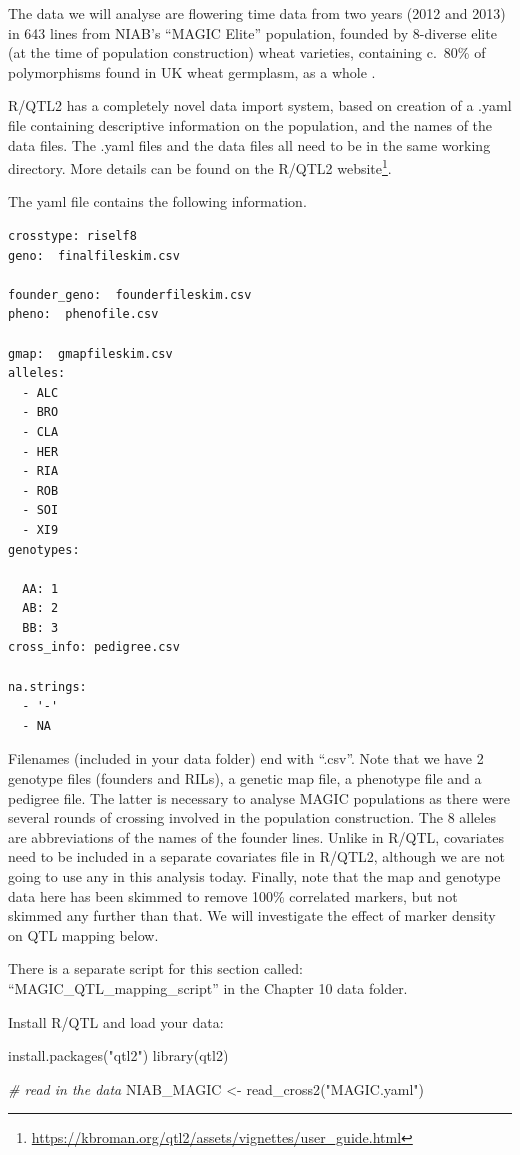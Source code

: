\documentclass[
]{book}
\makeatletter
\newenvironment{Shaded}{\begin{snugshade}}{\end{snugshade}}
\newcommand{\CommentTok}[1]{\textcolor[rgb]{0.56,0.35,0.01}{\textit{#1}}}
\newcommand{\FunctionTok}[1]{\textcolor[rgb]{0.00,0.00,0.00}{#1}}
\newcommand{\NormalTok}[1]{#1}
\newcommand{\OtherTok}[1]{\textcolor[rgb]{0.56,0.35,0.01}{#1}}
\newcommand{\StringTok}[1]{\textcolor[rgb]{0.31,0.60,0.02}{#1}}
\renewcommand{\href}[2]{#2\footnote{\url{#1}}}
\newenvironment{kframe}{%
\medskip{}
\setlength{\fboxsep}{.8em}
 \def\at@end@of@kframe{}%
 \ifinner\ifhmode%
  \def\at@end@of@kframe{\end{minipage}}%
  \begin{minipage}{\columnwidth}%
 \fi\fi%
 \def\FrameCommand##1{\hskip\@totalleftmargin \hskip-\fboxsep
 \colorbox{shadecolor}{##1}\hskip-\fboxsep
     \hskip-\linewidth \hskip-\@totalleftmargin \hskip\columnwidth}%
 \MakeFramed {\advance\hsize-\width
   \@totalleftmargin\z@ \linewidth\hsize
   \@setminipage}}%
 {\par\unskip\endMakeFramed%
 \at@end@of@kframe}
\newenvironment{rmdblock}[1]
  {
  \begin{itemize}
  \renewcommand{\labelitemi}{
    \raisebox{-.7\height}[0pt][0pt]{
      {\setkeys{Gin}{width=3em,keepaspectratio}\texttt{[image: images/\#1]}}
    }
  }
  \setlength{\fboxsep}{1em}
  \begin{kframe}
  \item
  }
  {
  \end{kframe}
  \end{itemize}
  }
\newenvironment{rmdnote}
  {\begin{rmdblock}{note}}
  {\end{rmdblock}}
\makeatother
\begin{document}
The data we will analyse are flowering time data from two years (2012 and 2013) in 643 lines from NIAB's ``MAGIC Elite'' population, founded by 8-diverse elite (at the time of population construction) wheat varieties, containing c.~80\% of polymorphisms found in UK wheat germplasm, as a whole \citep{Gardner_2016}.

R/QTL2 has a completely novel data import system, based on creation of a .yaml file containing descriptive information on the population, and the names of the data files. The .yaml files and the data files all need to be in the same working directory. More details can be found on the R/QTL2 \href{https://kbroman.org/qtl2/assets/vignettes/user_guide.html}{website}.

The yaml file contains the following information.

\begin{verbatim}
crosstype: riself8      
geno:  finalfileskim.csv

founder_geno:  founderfileskim.csv
pheno:  phenofile.csv

gmap:  gmapfileskim.csv
alleles:
  - ALC
  - BRO
  - CLA
  - HER
  - RIA
  - ROB
  - SOI
  - XI9
genotypes:

  AA: 1
  AB: 2
  BB: 3
cross_info: pedigree.csv

na.strings:
  - '-'
  - NA
\end{verbatim}

Filenames (included in your data folder) end with ``.csv''. Note that we have 2 genotype files (founders and RILs), a genetic map file, a phenotype file and a pedigree file. The latter is necessary to analyse MAGIC populations as there were several rounds of crossing involved in the population construction. The 8 alleles are abbreviations of the names of the founder lines. Unlike in R/QTL, covariates need to be included in a separate covariates file in R/QTL2, although we are not going to use any in this analysis today. Finally, note that the map and genotype data here has been skimmed to remove 100\% correlated markers, but not skimmed any further than that. We will investigate the effect of marker density on QTL mapping below.

\begin{rmdnote}
There is a separate script for this section called: ``MAGIC\_QTL\_mapping\_script'' in the Chapter 10 data folder.
\end{rmdnote}

Install R/QTL and load your data:

\begin{Shaded}
\begin{Highlighting}[]
\FunctionTok{install.packages}\NormalTok{(}\StringTok{"qtl2"}\NormalTok{)}
\FunctionTok{library}\NormalTok{(qtl2)}

\CommentTok{\# read in the data}
\NormalTok{NIAB\_MAGIC }\OtherTok{\textless{}{-}} \FunctionTok{read\_cross2}\NormalTok{(}\StringTok{"MAGIC.yaml"}\NormalTok{)}
\end{Highlighting}
\end{Shaded}
\end{document}
